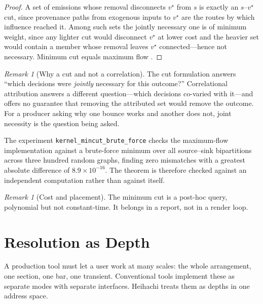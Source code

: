 \documentclass[11pt,twocolumn,a4paper]{article}
\theoremstyle{definition}
\theoremstyle{remark}
\newtheorem{remark}[theorem]{Remark}
\begin{document}
\begin{proof}
A set of emissions whose removal disconnects $v^{\star}$ from $s$ is exactly an
$s$--$v^{\star}$ cut, since provenance paths from exogenous inputs to
$v^{\star}$ are the routes by which influence reached it. Among such sets the
jointly necessary one is of minimum weight, since any lighter cut would
disconnect $v^{\star}$ at lower cost and the heavier set would contain a
member whose removal leaves $v^{\star}$ connected---hence not necessary. Minimum
cut equals maximum flow \citep{ford1956maximal}.
\end{proof}

\begin{remark}[Why a cut and not a correlation]
\label{rem:mincut-why}
The cut formulation answers ``which decisions were \emph{jointly} necessary for
this outcome?'' Correlational attribution answers a different question---which
decisions co-varied with it---and offers no guarantee that removing the
attributed set would remove the outcome. For a producer asking why one bounce
works and another does not, joint necessity is the question being asked.
\end{remark}

The experiment \texttt{kernel\_mincut\_brute\_force} checks the maximum-flow
implementation against a brute-force minimum over all source--sink bipartitions
across three hundred random graphs, finding zero mismatches with a greatest
absolute difference of $8.9\times 10^{-16}$. The theorem is therefore checked
against an independent computation rather than against itself.

\begin{remark}[Cost and placement]
\label{rem:offline}
The minimum cut is a post-hoc query, polynomial but not constant-time. It belongs
in a report, not in a render loop.
\end{remark}

\section{Resolution as Depth}
\label{sec:resolution}

A production tool must let a user work at many scales: the whole arrangement, one
section, one bar, one transient. Conventional tools implement these as separate
modes with separate interfaces. Heihachi treats them as depths in one address
space.
\end{document}

